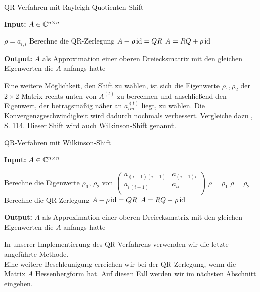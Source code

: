 \documentclass{article}
\begin{document}
\begin{theorem}
\renewcommand{\algorithmicrequire}{\textbf{Input:}}
\renewcommand{\algorithmicensure}{\textbf{Output:}}

\begin{algorithm}

	\caption{QR-Verfahren mit Rayleigh-Quotienten-Shift}
	\label{QR-Verfahren_shifts_rayleigh}
	\algorithmicrequire{ $A \in \mathbb{C}^{n\times n}$}
	\begin{algorithmic}[1]
				\State $\rho = a_{i,i}$
				\State Berechne die QR-Zerlegung $A - \rho \operatorname{id} = QR$
				\State $A = RQ + \rho \operatorname{id}$
			\EndWhile
		\EndFor
	\end{algorithmic}
	\algorithmicensure{ $A$ als Approximation einer oberen Dreiecksmatrix mit den gleichen Eigenwerten die $A$ anfangs hatte}
\end{algorithm}

Eine weitere Möglichkeit, den Shift zu wählen, ist sich die Eigenwerte $\rho_1, \rho_2$ der $2 \times 2$ Matrix rechts unten von $A^{(t)}$ zu berechnen und anschließend den Eigenwert, der betragsmäßig näher an $a^{(t)}_{nn}$ liegt, zu wählen. Die Konvergenzgeschwindigkeit wird dadurch nochmals verbessert. Vergleiche dazu \cite{Num}, S. 114. Dieser Shift wird auch Wilkinson-Shift genannt.


\begin{algorithm}[H]
	\label{QR-Verfahren_shifts}
	\caption{QR-Verfahren mit Wilkinson-Shift}
	\algorithmicrequire{ $A \in \mathbb{C}^{n\times n}$}
	\begin{algorithmic}[1]
		\State Berechne die Eigenwerte $\rho_1$, $\rho_2$ von $\left(\begin{array}{rr}
			a_{(i-1)(i-1)}&a_{(i-1)i}\\
			a_{i(i-1)}&a_{ii}\\
		\end{array}\right)$
		\State $\rho = \rho_1$
		\Else
		\State $\rho = \rho_2$
		\EndIf
		\State Berechne die QR-Zerlegung $A - \rho \operatorname{id} = QR$
		\State $A = RQ + \rho \operatorname{id}$
		\EndWhile
		\EndFor
	\end{algorithmic}
	\algorithmicensure{ $A$ als Approximation einer oberen Dreiecksmatrix mit den gleichen Eigenwerten die $A$ anfangs hatte}
\end{algorithm}


In unserer Implementierung des QR-Verfahrens verwenden wir die letzte angeführte Methode.\\
Eine weitere Beschleunigung erreichen wir bei der QR-Zerlegung, wenn die Matrix $A$ Hessenbergform hat. Auf diesen Fall werden wir im nächsten Abschnitt eingehen.


\end{theorem}
\end{document}
